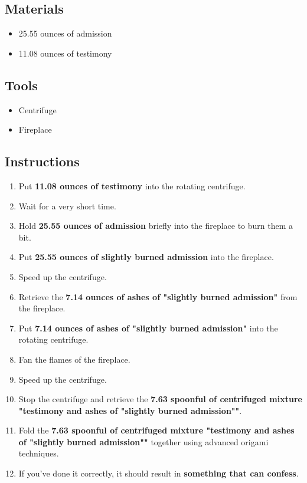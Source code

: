 \documentclass{article}
\begin{document}
\subsection{Materials}\begin{itemize}
\item 
25.55 ounces of admission
\item 
11.08 ounces of testimony
\end{itemize}
\subsection{Tools}\begin{itemize}
\item 
Centrifuge
\item 
Fireplace
\end{itemize}
\subsection{Instructions}\begin{enumerate}
\item 
Put \textbf{11.08 ounces of testimony} into the rotating centrifuge.
\item 
Wait for a very short time.
\item 
Hold \textbf{25.55 ounces of admission} briefly into the fireplace to burn them a bit.
\item 
Put \textbf{25.55 ounces of slightly burned admission} into the fireplace.
\item 
Speed up the centrifuge.
\item 
Retrieve the \textbf{7.14 ounces of ashes of "slightly burned admission"} from the fireplace.
\item 
Put \textbf{7.14 ounces of ashes of "slightly burned admission"} into the rotating centrifuge.
\item 
Fan the flames of the fireplace.
\item 
Speed up the centrifuge.
\item 
Stop the centrifuge and retrieve the \textbf{7.63 spoonful of centrifuged mixture "testimony and ashes of "slightly burned admission""}.
\item 
Fold the \textbf{7.63 spoonful of centrifuged mixture "testimony and ashes of "slightly burned admission""} together using advanced origami techniques.
\item 
If you've done it correctly, it should result in \textbf{something that can confess}.
\end{enumerate}
\newpage
\end{document}
